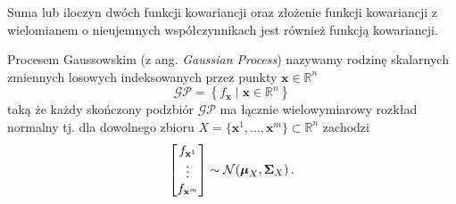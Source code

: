 \documentclass{myclass}
\numberwithin{equation}{section}
\begin{document}
\begin{theorem}
Suma lub iloczyn dwóch funkcji kowariancji oraz złożenie funkcji kowariancji z wielomianem o
nieujemnych współczynnikach jest również funkcją kowariancji.
\end{theorem}

\begin{definition}
Procesem Gaussowskim (z ang. \textit{Gaussian Process}) nazywamy rodzinę skalarnych zmiennych
losowych indeksowanych przez punkty \(\mathbf{x} \in \mathbb{R}^n\)
\begin{equation*}
    \mathcal{GP} = \left\{f_\mathbf{x} \mid \mathbf{x} \in \mathbb{R}^n\right\}
\end{equation*}
taką że każdy skończony podzbiór \(\mathcal{GP}\) ma łącznie wielowymiarowy rozkład normalny tj. dla
dowolnego zbioru \(X = \{\mathbf{x}^1, \ldots, \mathbf{x}^m\} \subset \mathbb{R}^n\) zachodzi
\begin{equation*}
    \mqty[f_{\mathbf{x}^1} \\ \vdots \\ f_{\mathbf{x}^m}] \sim \mathcal{N}(\boldsymbol{\mu}_X, \mathbf{\Sigma}_{X})\,.
\end{equation*}
\end{definition}
\end{document}
